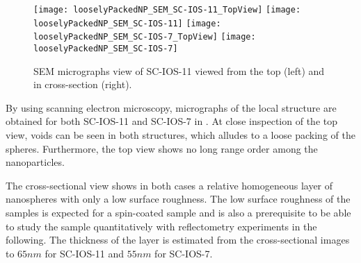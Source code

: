 \documentclass[\main/dresen_thesis.tex]{subfiles}
\begin{document}
  \label{sec:looselyPackedNS:layers:sem}
  \begin{figure}[tb]
    \centering
    \texttt{[image: looselyPackedNP\_SEM\_SC-IOS-11\_TopView]}
    \texttt{[image: looselyPackedNP\_SEM\_SC-IOS-11]}
    \texttt{[image: looselyPackedNP\_SEM\_SC-IOS-7\_TopView]}
    \texttt{[image: looselyPackedNP\_SEM\_SC-IOS-7]}
    \caption{\label{fig:looselyPackedNP:nuclearStructure:sem}SEM micrographs view of SC-IOS-11 viewed from the top (left) and in cross-section (right).}
  \end{figure}
  By using scanning electron microscopy, micrographs of the local structure are obtained for both SC-IOS-11  and SC-IOS-7 in .
  At close inspection of the top view, voids can be seen in both structures, which alludes to a loose packing of the spheres.
  Furthermore, the top view shows no long range order among the nanoparticles.

  The cross-sectional view shows in both cases a relative homogeneous layer of nanospheres with only a low surface roughness.
  The low surface roughness of the samples is expected for a spin-coated sample and is also a prerequisite to be able to study the sample quantitatively with reflectometry experiments in the following.
  The thickness of the layer is estimated from the cross-sectional images to $65 \unit{nm}$ for SC-IOS-11 and $55 \unit{nm}$ for SC-IOS-7.


\end{document}
